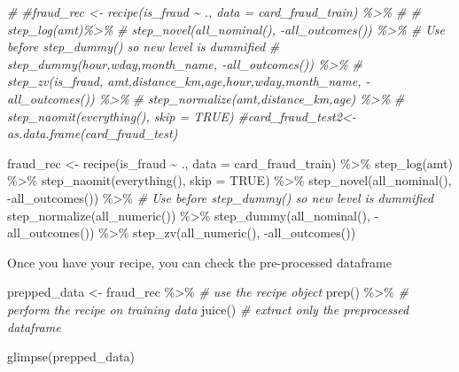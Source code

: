 \documentclass[
]{article}
\newenvironment{Shaded}{\begin{snugshade}}{\end{snugshade}}
\newcommand{\AttributeTok}[1]{\textcolor[rgb]{0.77,0.63,0.00}{#1}}
\newcommand{\CommentTok}[1]{\textcolor[rgb]{0.56,0.35,0.01}{\textit{#1}}}
\newcommand{\ConstantTok}[1]{\textcolor[rgb]{0.00,0.00,0.00}{#1}}
\newcommand{\FunctionTok}[1]{\textcolor[rgb]{0.00,0.00,0.00}{#1}}
\newcommand{\NormalTok}[1]{#1}
\newcommand{\OtherTok}[1]{\textcolor[rgb]{0.56,0.35,0.01}{#1}}
\newcommand{\SpecialCharTok}[1]{\textcolor[rgb]{0.00,0.00,0.00}{#1}}
\begin{document}
\begin{Shaded}
\begin{Highlighting}[]
\CommentTok{\# \#fraud\_rec \textless{}{-} recipe(is\_fraud \textasciitilde{} ., data = card\_fraud\_train) \%\textgreater{}\%}
\CommentTok{\#  \# step\_log(amt)\%\textgreater{}\%}
\CommentTok{\#   step\_novel(all\_nominal(), {-}all\_outcomes()) \%\textgreater{}\% \# Use before \textasciigrave{}step\_dummy()\textasciigrave{} so new level is dummified}
\CommentTok{\#   step\_dummy(hour,wday,month\_name, {-}all\_outcomes()) \%\textgreater{}\% }
\CommentTok{\#   step\_zv(is\_fraud, amt,distance\_km,age,hour,wday,month\_name, {-}all\_outcomes())  \%\textgreater{}\% }
\CommentTok{\#   step\_normalize(amt,distance\_km,age) \%\textgreater{}\% }
\CommentTok{\#   step\_naomit(everything(), skip = TRUE)}
\CommentTok{\#card\_fraud\_test2\textless{}{-}as.data.frame(card\_fraud\_test)}

\NormalTok{fraud\_rec }\OtherTok{\textless{}{-}} \FunctionTok{recipe}\NormalTok{(is\_fraud }\SpecialCharTok{\textasciitilde{}}\NormalTok{ ., }\AttributeTok{data =}\NormalTok{ card\_fraud\_train) }\SpecialCharTok{\%\textgreater{}\%}
  \FunctionTok{step\_log}\NormalTok{(amt) }\SpecialCharTok{\%\textgreater{}\%} 
  \FunctionTok{step\_naomit}\NormalTok{(}\FunctionTok{everything}\NormalTok{(), }\AttributeTok{skip =} \ConstantTok{TRUE}\NormalTok{) }\SpecialCharTok{\%\textgreater{}\%} 
  \FunctionTok{step\_novel}\NormalTok{(}\FunctionTok{all\_nominal}\NormalTok{(), }\SpecialCharTok{{-}}\FunctionTok{all\_outcomes}\NormalTok{()) }\SpecialCharTok{\%\textgreater{}\%} \CommentTok{\# Use before \textasciigrave{}step\_dummy()\textasciigrave{} so new level is dummified}
  \FunctionTok{step\_normalize}\NormalTok{(}\FunctionTok{all\_numeric}\NormalTok{()) }\SpecialCharTok{\%\textgreater{}\%} 
  \FunctionTok{step\_dummy}\NormalTok{(}\FunctionTok{all\_nominal}\NormalTok{(), }\SpecialCharTok{{-}}\FunctionTok{all\_outcomes}\NormalTok{()) }\SpecialCharTok{\%\textgreater{}\%} 
  \FunctionTok{step\_zv}\NormalTok{(}\FunctionTok{all\_numeric}\NormalTok{(), }\SpecialCharTok{{-}}\FunctionTok{all\_outcomes}\NormalTok{())}
\end{Highlighting}
\end{Shaded}

Once you have your recipe, you can check the pre-processed dataframe

\begin{Shaded}
\begin{Highlighting}[]
\NormalTok{prepped\_data }\OtherTok{\textless{}{-}} 
\NormalTok{  fraud\_rec }\SpecialCharTok{\%\textgreater{}\%} \CommentTok{\# use the recipe object}
  \FunctionTok{prep}\NormalTok{() }\SpecialCharTok{\%\textgreater{}\%} \CommentTok{\# perform the recipe on training data}
  \FunctionTok{juice}\NormalTok{() }\CommentTok{\# extract only the preprocessed dataframe }

\FunctionTok{glimpse}\NormalTok{(prepped\_data)}
\end{Highlighting}
\end{Shaded}
\end{document}
